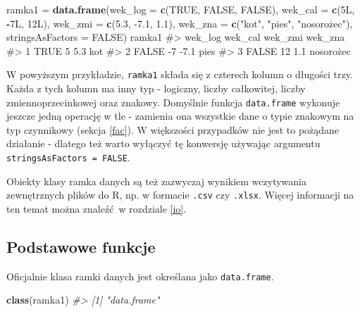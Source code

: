 \documentclass[paper=6in:9in,pagesize=pdftex,headinclude=on,footinclude=on,10pt]{scrbook}
\makeatletter
\newenvironment{Shaded}{\begin{snugshade}}{\end{snugshade}}
\newcommand{\CommentTok}[1]{\textcolor[rgb]{0.56,0.35,0.01}{\textit{#1}}}
\newcommand{\DataTypeTok}[1]{\textcolor[rgb]{0.13,0.29,0.53}{#1}}
\newcommand{\FloatTok}[1]{\textcolor[rgb]{0.00,0.00,0.81}{#1}}
\newcommand{\KeywordTok}[1]{\textcolor[rgb]{0.13,0.29,0.53}{\textbf{#1}}}
\newcommand{\NormalTok}[1]{#1}
\newcommand{\OperatorTok}[1]{\textcolor[rgb]{0.81,0.36,0.00}{\textbf{#1}}}
\newcommand{\OtherTok}[1]{\textcolor[rgb]{0.56,0.35,0.01}{#1}}
\newcommand{\StringTok}[1]{\textcolor[rgb]{0.31,0.60,0.02}{#1}}
\newenvironment{kframe}{%
\medskip{}
\setlength{\fboxsep}{.8em}
 \def\at@end@of@kframe{}%
 \ifinner\ifhmode%
  \def\at@end@of@kframe{\end{minipage}}%
  \begin{minipage}{\columnwidth}%
 \fi\fi%
 \def\FrameCommand##1{\hskip\@totalleftmargin \hskip-\fboxsep
 \colorbox{shadecolor}{##1}\hskip-\fboxsep
     \hskip-\linewidth \hskip-\@totalleftmargin \hskip\columnwidth}%
 \MakeFramed {\advance\hsize-\width
   \@totalleftmargin\z@ \linewidth\hsize
   \@setminipage}}%
 {\par\unskip\endMakeFramed%
 \at@end@of@kframe}
\newenvironment{rmdblock}[1]
  {
  \begin{itemize}
  \renewcommand{\labelitemi}{
    \raisebox{-.7\height}[0pt][0pt]{
      {\setkeys{Gin}{width=3em,keepaspectratio}\texttt{[image: images/\#1]}}
    }
  }
  \setlength{\fboxsep}{1em}
  \begin{kframe}
  \item
  }
  {
  \end{kframe}
  \end{itemize}
  }
\newenvironment{rmdinfo}
  {\begin{rmdblock}{compass}}
  {\end{rmdblock}}
\makeatother
\begin{document}
\begin{Shaded}
\begin{Highlighting}[]
\NormalTok{ramka1 =}\StringTok{ }\KeywordTok{data.frame}\NormalTok{(}\DataTypeTok{wek_log =} \KeywordTok{c}\NormalTok{(}\OtherTok{TRUE}\NormalTok{, }\OtherTok{FALSE}\NormalTok{, }\OtherTok{FALSE}\NormalTok{),}
                    \DataTypeTok{wek_cal =} \KeywordTok{c}\NormalTok{(5L, }\OperatorTok{-}\NormalTok{7L, 12L), }
                    \DataTypeTok{wek_zmi =} \KeywordTok{c}\NormalTok{(}\FloatTok{5.3}\NormalTok{, }\FloatTok{-7.1}\NormalTok{, }\FloatTok{1.1}\NormalTok{), }
                    \DataTypeTok{wek_zna =} \KeywordTok{c}\NormalTok{(}\StringTok{"kot"}\NormalTok{, }\StringTok{"pies"}\NormalTok{, }\StringTok{"nosorożec"),}
\StringTok{                    stringsAsFactors = FALSE)}
\StringTok{ramka1}
\StringTok{#>   wek_log wek_cal wek_zmi   wek_zna}
\StringTok{#> 1    TRUE       5     5.3       kot}
\StringTok{#> 2   FALSE      -7    -7.1      pies}
\StringTok{#> 3   FALSE      12     1.1 nosorożec}
\end{Highlighting}
\end{Shaded}

W powyższym przykładzie, \texttt{ramka1} składa się z czterech kolumn o długości trzy.
Każda z tych kolumn ma inny typ - logiczny, liczby całkowitej, liczby zmiennoprzecinkowej oraz znakowy.
Domyślnie funkcja \texttt{data.frame} wykonuje jeszcze jedną operację w tle - zamienia ona wszystkie dane o typie znakowym na typ czynnikowy (sekcja \ref{fac}).
W większości przypadków nie jest to pożądane działanie - dlatego też warto wyłączyć tę konwersję używając argumentu \texttt{stringsAsFactors\ =\ FALSE}.

\begin{rmdinfo}
Obiekty klasy ramka danych są też zazwyczaj wynikiem wczytywania zewnętrznych plików do R, np. w formacie \texttt{.csv} czy \texttt{.xlsx}.
Więcej informacji na ten temat można znaleźć~w rozdziale \ref{io}.
\end{rmdinfo}

\hypertarget{podstawowe-funkcje-1}{%
\subsection{Podstawowe funkcje}\label{podstawowe-funkcje-1}}

Oficjalnie klasa ramki danych jest określana jako \texttt{data.frame}.

\begin{Shaded}
\begin{Highlighting}[]
\KeywordTok{class}\NormalTok{(ramka1)}
\CommentTok{#> [1] "data.frame"}
\end{Highlighting}
\end{Shaded}
\end{document}

